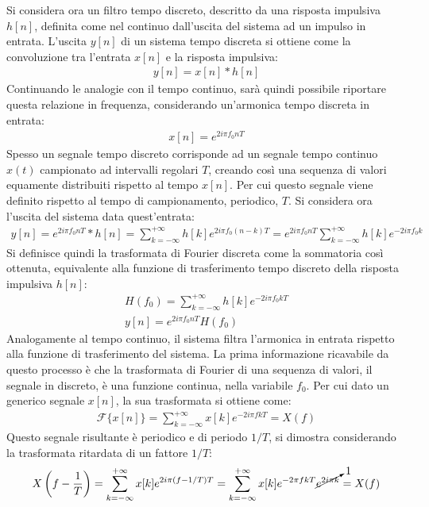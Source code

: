 \documentclass{article}
\numberwithin{equation}{subsection}
\begin{document}
Si considera ora un filtro tempo discreto, descritto da una risposta impulsiva $h[n]$, definita come nel continuo dall'uscita del sistema ad un impulso in entrata. L'uscita 
$y[n]$ di un sistema tempo discreta si ottiene come la convoluzione tra l'entrata $x[n]$ e la risposta impulsiva:
\begin{gather*}
    y[n]=x[n]*h[n]
\end{gather*}
Continuando le analogie con il tempo continuo, sarà quindi possibile riportare questa relazione in frequenza, considerando un'armonica tempo discreta in entrata:
\begin{gather*}
    x[n]=e^{2i\pi f_0nT}
\end{gather*}
Spesso un segnale tempo discreto corrisponde ad un segnale tempo continuo $x(t)$ campionato ad intervalli regolari $T$, creando così una sequenza di valori equamente 
distribuiti rispetto al tempo $x[n]$. Per cui questo segnale viene definito rispetto al tempo di campionamento, periodico, $T$. Si considera ora l'uscita del sistema 
data quest'entrata:
\begin{gather*}
    y[n]=e^{2i\pi f_0nT}*h[n]=\displaystyle\sum_{k=-\infty}^{+\infty}h[k]e^{2i\pi f_0(n-k)T}=e^{2i\pi f_0nT}\displaystyle\sum_{k=-\infty}^{+\infty}h[k]e^{-2i\pi f_0k}
\end{gather*}
Si definisce quindi la trasformata di Fourier discreta come la sommatoria così ottenuta, equivalente alla funzione di trasferimento tempo discreto della risposta 
impulsiva $h[n]$:
\begin{gather*}
    H(f_0)=\displaystyle\sum_{k=-\infty}^{+\infty}h[k]e^{-2i\pi f_0kT}\\
    y[n]=e^{2i\pi f_0nT}H(f_0)
\end{gather*}
Analogamente al tempo continuo, il sistema filtra l'armonica in entrata rispetto alla funzione di trasferimento del sistema. 
La prima informazione ricavabile da questo processo è che la trasformata di Fourier di una sequenza di valori, il segnale in discreto, è una funzione continua, nella 
variabile $f_0$. Per cui dato un generico segnale $x[n]$, la sua trasformata si ottiene come:
\begin{gather}
    \mathscr{F}\{x[n]\}=\displaystyle\sum_{k=-\infty}^{+\infty}x[k]e^{-2i\pi fkT}=X(f)
\end{gather}
Questo segnale risultante è periodico e di periodo $1/T$, si dimostra considerando la trasformata ritardata di un fattore $1/T$:
\begin{gather*}
    X\left(\displaystyle f-\frac{1}{T}\right)=\displaystyle\sum_{k=-\infty}^{+\infty}x[k]e^{2i\pi (f-1/T)T}=\displaystyle\sum_{k=-\infty}^{+\infty}x[k]e^{-2\pi fkT}\cancelto{1}{e^{2i\pi k}}=X(f)
\end{gather*}
\end{document}

